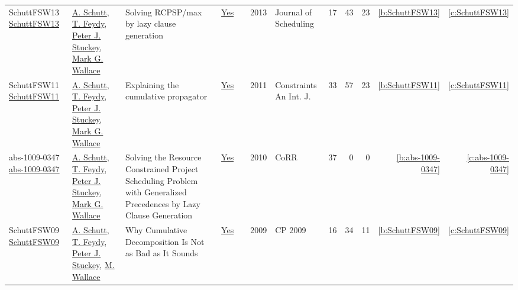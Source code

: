 {\begin{longtable}{>{\raggedright\arraybackslash}p{3cm}>{\raggedright\arraybackslash}p{6cm}>{\raggedright\arraybackslash}p{6.5cm}rrrp{2.5cm}rrrrr}
SchuttFSW13 \href{https://doi.org/10.1007/s10951-012-0285-x}{SchuttFSW13} & \hyperref[auth:a125]{A. Schutt}, \hyperref[auth:a155]{T. Feydy}, \hyperref[auth:a126]{Peter J. Stuckey}, \hyperref[auth:a156]{Mark G. Wallace} & Solving RCPSP/max by lazy clause generation & \href{../works/SchuttFSW13.pdf}{Yes} & \cite{SchuttFSW13} & 2013 & Journal of Scheduling & 17 & 43 & 23 & \ref{b:SchuttFSW13} & \ref{c:SchuttFSW13}\\
SchuttFSW11 \href{https://doi.org/10.1007/s10601-010-9103-2}{SchuttFSW11} & \hyperref[auth:a125]{A. Schutt}, \hyperref[auth:a155]{T. Feydy}, \hyperref[auth:a126]{Peter J. Stuckey}, \hyperref[auth:a156]{Mark G. Wallace} & Explaining the cumulative propagator & \href{../works/SchuttFSW11.pdf}{Yes} & \cite{SchuttFSW11} & 2011 & Constraints An Int. J. & 33 & 57 & 23 & \ref{b:SchuttFSW11} & \ref{c:SchuttFSW11}\\
abs-1009-0347 \href{http://arxiv.org/abs/1009.0347}{abs-1009-0347} & \hyperref[auth:a125]{A. Schutt}, \hyperref[auth:a155]{T. Feydy}, \hyperref[auth:a126]{Peter J. Stuckey}, \hyperref[auth:a156]{Mark G. Wallace} & Solving the Resource Constrained Project Scheduling Problem with Generalized Precedences by Lazy Clause Generation & \href{../works/abs-1009-0347.pdf}{Yes} & \cite{abs-1009-0347} & 2010 & CoRR & 37 & 0 & 0 & \ref{b:abs-1009-0347} & \ref{c:abs-1009-0347}\\
SchuttFSW09 \href{https://doi.org/10.1007/978-3-642-04244-7\_58}{SchuttFSW09} & \hyperref[auth:a125]{A. Schutt}, \hyperref[auth:a155]{T. Feydy}, \hyperref[auth:a126]{Peter J. Stuckey}, \hyperref[auth:a117]{M. Wallace} & Why Cumulative Decomposition Is Not as Bad as It Sounds & \href{../works/SchuttFSW09.pdf}{Yes} & \cite{SchuttFSW09} & 2009 & CP 2009 & 16 & 34 & 11 & \ref{b:SchuttFSW09} & \ref{c:SchuttFSW09}\\
\end{longtable}
}

\clearpage
